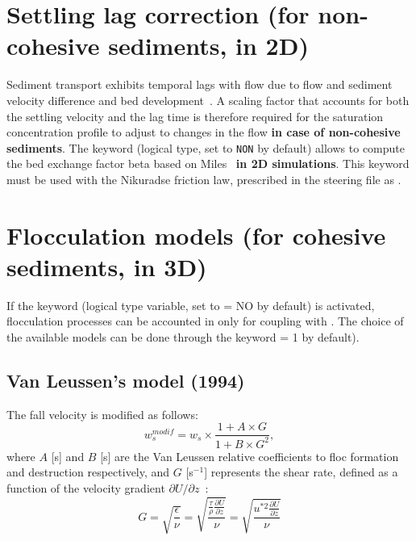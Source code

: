 \section{Settling lag correction (for non-cohesive sediments, in 2D)}
Sediment transport exhibits temporal lags with flow due to flow and sediment velocity difference and bed development~\cite{wu2007computational, Miles96}. A scaling factor that accounts for both the settling velocity and the lag time is therefore required for the saturation concentration profile to adjust to changes in the flow {\bf in case of non-cohesive sediments}.
The keyword  (logical type, set to \texttt{NON} by default) allows to compute the bed exchange factor beta based on Miles~\cite{Miles96} {\bf in 2D simulations}. This keyword must be used with the Nikuradse friction law, prescribed in the  steering file as .

\section{Flocculation models (for cohesive sediments, in 3D)}
If the keyword  (logical type variable, set to {\ttfamily = NO} by default) is activated, flocculation processes can be accounted in \gaia only for coupling with . The choice of the available models can be done through the keyword  {\ttfamily = 1} by default).
\subsection{Van Leussen's model (1994)}
The fall velocity is modified as follows:
\begin{equation*}
w_{s}^{modif} = w_s \times \frac{1+A \times G}{1 + B\times G^{2}},
\end{equation*}
where $A$ [s] and $B$ [s] are the Van Leussen relative coefficients to floc formation and destruction respectively, and $G$ [s$^{-1}$] represents the shear rate, defined as a function of the velocity gradient $\partial U/\partial z$~\cite{Camp1943}:
\begin{equation*}
G = \sqrt{\frac{\epsilon}{\nu}}=\sqrt{\frac{\frac{\tau}{\rho}\frac{\partial U}{\partial z}}{\nu}}=\sqrt{\frac{u^{*2}\frac{\partial U}{\partial z}}{\nu}}
\end{equation*}

